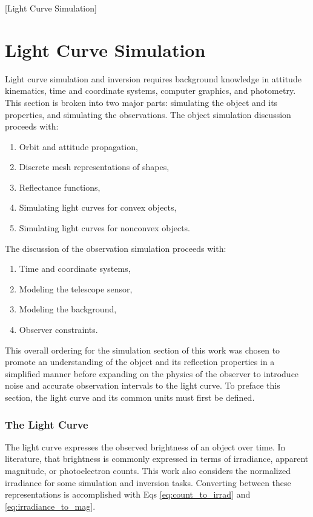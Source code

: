 [Light Curve Simulation]

\chapter{Light Curve Simulation}

Light curve simulation and inversion requires background knowledge in attitude kinematics, time and coordinate systems, computer graphics, and photometry. This section is broken into two major parts: simulating the object and its properties, and simulating the observations. The object simulation discussion proceeds with:

\begin{enumerate}
  \item Orbit and attitude propagation,
  \item Discrete mesh representations of shapes,
  \item Reflectance functions,
  \item Simulating light curves for convex objects,
  \item Simulating light curves for nonconvex objects.
\end{enumerate}

The discussion of the observation simulation proceeds with:

\begin{enumerate}
  \item Time and coordinate systems,
  \item Modeling the telescope sensor,
  \item Modeling the background,
  \item Observer constraints.
\end{enumerate}

This overall ordering for the simulation section of this work was chosen to promote an understanding of the object and its reflection properties in a simplified manner before expanding on the physics of the observer to introduce noise and accurate observation intervals to the light curve. To preface this section, the light curve and its common units must first be defined.

\subsection{The Light Curve}

The light curve expresses the observed brightness of an object over time. In literature, that brightness is commonly expressed in terms of irradiance, apparent magnitude, or photoelectron counts. This work also considers the normalized irradiance for some simulation and inversion tasks. Converting between these representations is accomplished with Eqs \ref{eq:count_to_irrad} and \ref{eq:irradiance_to_mag}.

